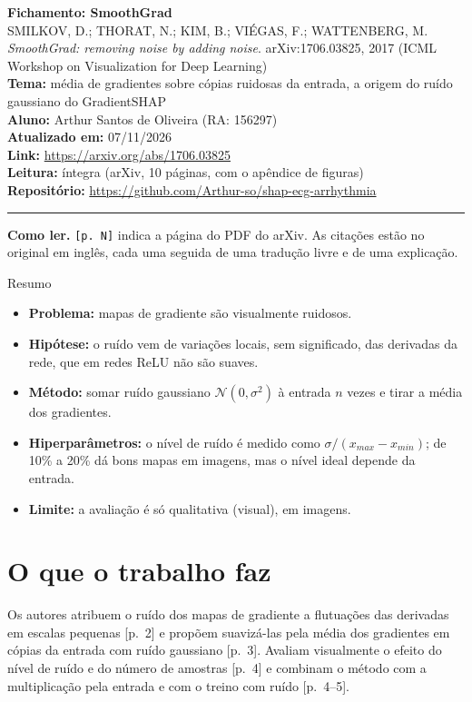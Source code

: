 \documentclass[11pt,a4paper]{article}
\begin{document}
\begin{center}
    {\LARGE \textbf{Fichamento: SmoothGrad}} \\[0.35em]
    {\large SMILKOV, D.; THORAT, N.; KIM, B.; VIÉGAS, F.; WATTENBERG, M. \textit{SmoothGrad: removing noise by adding noise}. arXiv:1706.03825, 2017 (ICML Workshop on Visualization for Deep Learning)} \\[0.3em]
    \textbf{Tema:} média de gradientes sobre cópias ruidosas da entrada, a origem do ruído gaussiano do GradientSHAP \\[0.2em]
    \textbf{Aluno:} Arthur Santos de Oliveira (RA: 156297) \\[0.2em]
    \textbf{Atualizado em:} 07/11/2026 \\[0.2em]
    \textbf{Link:} \url{https://arxiv.org/abs/1706.03825} \\[0.2em]
    \textbf{Leitura:} íntegra (arXiv, 10 páginas, com o apêndice de figuras) \\[0.2em]
    \textbf{Repositório:} \url{https://github.com/Arthur-so/shap-ecg-arrhythmia}
\end{center}
\vspace{-0.5em}
\hrule
\vspace{0.8em}

\textbf{Como ler.} \texttt{[p. N]} indica a página do PDF do arXiv. As citações estão no original em inglês, cada uma seguida de uma tradução livre e de uma explicação.

\begin{infobox}[note]{Resumo}
\begin{itemize}
\item \textbf{Problema:} mapas de gradiente são visualmente ruidosos.
\item \textbf{Hipótese:} o ruído vem de variações locais, sem significado, das derivadas da rede, que em redes ReLU não são suaves.
\item \textbf{Método:} somar ruído gaussiano $\mathcal{N}(0, \sigma^2)$ à entrada $n$ vezes e tirar a média dos gradientes.
\item \textbf{Hiperparâmetros:} o nível de ruído é medido como $\sigma/(x_{max} - x_{min})$; de 10\% a 20\% dá bons mapas em imagens, mas o nível ideal depende da entrada.
\item \textbf{Limite:} a avaliação é só qualitativa (visual), em imagens.
\end{itemize}
\end{infobox}

\section{O que o trabalho faz}
Os autores atribuem o ruído dos mapas de gradiente a flutuações das derivadas em escalas pequenas [p.~2] e propõem suavizá-las pela média dos gradientes em cópias da entrada com ruído gaussiano [p.~3]. Avaliam visualmente o efeito do nível de ruído e do número de amostras [p.~4] e combinam o método com a multiplicação pela entrada e com o treino com ruído [p.~4--5].
\end{document}
